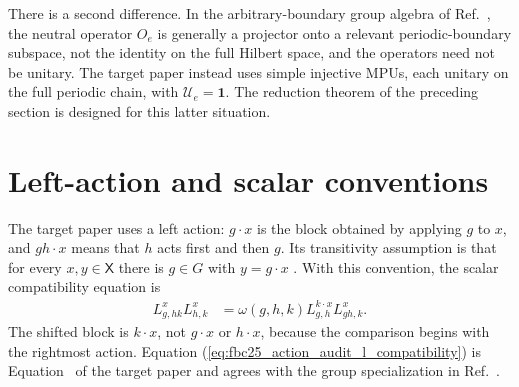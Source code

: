 \documentclass{article}
\begin{document}
There is a second difference.  In the arbitrary-boundary group algebra of
Ref.~\cite[source lines~638--683]{GarreRubio2023MPOSym}, the neutral operator
$O_e$ is generally a projector onto a relevant periodic-boundary subspace,
not the identity on the full Hilbert space, and the operators need not be
unitary.  The target paper instead uses simple injective MPUs, each unitary on
the full periodic chain, with $\mathcal U_e=\mathbf 1$.  The reduction theorem
of the preceding section is designed for this latter situation.

\section{Left-action and scalar conventions}

The target paper uses a left action: $g\mathbin{\cdot}x$ is the block obtained
by applying $g$ to $x$, and $gh\mathbin{\cdot}x$ means that $h$ acts first and
then $g$.  Its transitivity assumption is that for every $x,y\in\mathsf X$
there is $g\in G$ with $y=g\mathbin{\cdot}x$
\cite[lines~1782--1785]{FrancoRubio2025MPUGauging}.  With this convention,
the scalar compatibility equation is
\begin{align}
    L^x_{g,hk}L^x_{h,k}
        &=\omega(g,h,k)L^{k\mathbin{\cdot}x}_{g,h}L^x_{gh,k}.
    \label{eq:fbc25_action_audit_l_compatibility}
\end{align}
The shifted block is $k\mathbin{\cdot}x$, not
$g\mathbin{\cdot}x$ or $h\mathbin{\cdot}x$, because the comparison begins
with the rightmost action.  Equation
(\ref{eq:fbc25_action_audit_l_compatibility}) is
Equation~ of the target paper
\cite[lines~1920--1924]{FrancoRubio2025MPUGauging} and agrees with the group
specialization in Ref.~\cite[source lines~683--719]{GarreRubio2023MPOSym}.
\end{document}
